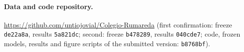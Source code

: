 \documentclass[11pt,a4paper]{article}
\begin{document}
\paragraph{Data and code repository.} \url{https://github.com/untiojovial/Colegio-Rumareda} (first confirmation: freeze \texttt{de22a8a}, results \texttt{5a821dc}; second: freeze \texttt{b478289}, results \texttt{040cde7}; code, frozen models, results and figure scripts of the submitted version: \texttt{b8768bf}).
\end{document}
